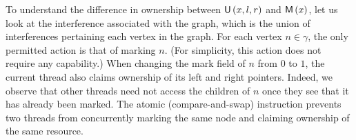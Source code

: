 To understand the difference in ownership between $\textsf{U}\left(x, l, r\right)$ and $\textsf{M}\left(x\right)$, let us look at the interference associated
with the graph, which is the union of interferences pertaining each
vertex in the graph. For each vertex $n \in \gamma$, the only
permitted action is that of marking $n$. (For simplicity, this action
does not require any capability.)  When changing the mark field of $n$
from $0$ to $1$, the current thread also claims ownership of its left
and right pointers. Indeed, we observe that other threads need not
access the children of $n$ once they see that it has already been
marked. The atomic  (compare-and-swap) instruction prevents
two threads from concurrently marking the same node and claiming
ownership of the same resource.

